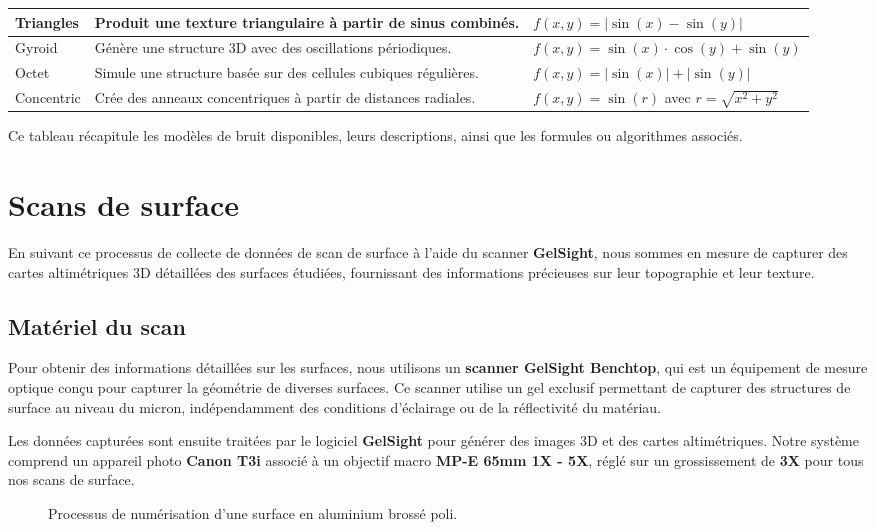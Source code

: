 \begin{longtable}{|p{4cm}|p{7cm}|p{5cm}|}
    Triangles & Produit une texture triangulaire à partir de sinus combinés. & $f(x, y) = |\sin(x) - \sin(y)|$ \\ \hline
    Gyroid & Génère une structure 3D avec des oscillations périodiques. & $f(x, y) = \sin(x) \cdot \cos(y) + \sin(y)$ \\ \hline
    Octet & Simule une structure basée sur des cellules cubiques régulières. & $f(x, y) = |\sin(x)| + |\sin(y)|$ \\ \hline
    Concentric & Crée des anneaux concentriques à partir de distances radiales. & $f(x, y) = \sin(r)$ avec $r = \sqrt{x^2 + y^2}$ \\ \hline
\end{longtable}

\noindent Ce tableau récapitule les modèles de bruit disponibles, leurs descriptions, ainsi que les formules ou algorithmes associés.


\section{Scans de surface}
En suivant ce processus de collecte de données de scan de surface à l’aide du scanner \textbf{GelSight}, nous sommes en mesure de capturer des cartes altimétriques 3D détaillées des surfaces étudiées, fournissant des informations précieuses sur leur topographie et leur texture.

\subsection{Matériel du scan}
Pour obtenir des informations détaillées sur les surfaces, nous utilisons un \textbf{scanner GelSight Benchtop}, qui est un équipement de mesure optique conçu pour capturer la géométrie de diverses surfaces. Ce scanner utilise un gel exclusif permettant de capturer des structures de surface au niveau du micron, indépendamment des conditions d’éclairage ou de la réflectivité du matériau.

Les données capturées sont ensuite traitées par le logiciel \textbf{GelSight} pour générer des images 3D et des cartes altimétriques. Notre système comprend un appareil photo \textbf{Canon T3i} associé à un objectif macro \textbf{MP-E 65mm 1X - 5X}, réglé sur un grossissement de \textbf{3X} pour tous nos scans de surface.

\begin{figure}[h]
    \centering
    \hfill
    \caption{Processus de numérisation d'une surface en aluminium brossé poli.}
    \label{fig:scan_process}
\end{figure}


